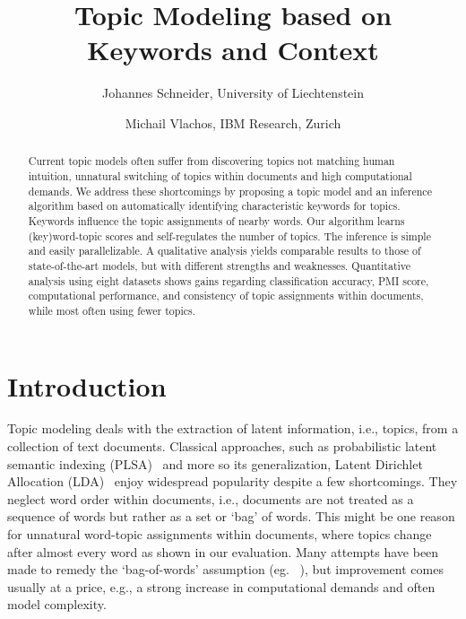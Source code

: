 \documentclass[twocolumn,10]{article}
\title{Topic Modeling based on Keywords and Context}
\author{Johannes Schneider, University of Liechtenstein \and Michail Vlachos, IBM Research, Zurich}
\newcommand{\ci}{~\cite} \newcommand{\re}{~\ref} \newcommand{\ma}{\mathbb}
\begin{document}
	\maketitle
	\begin{abstract}
		Current topic models often suffer from discovering topics not matching human intuition, unnatural switching of topics within documents and high computational demands. We address these shortcomings by proposing a topic model and an inference algorithm based on automatically identifying characteristic keywords for topics. Keywords influence the topic assignments of nearby words. Our algorithm learns (key)word-topic scores and self-regulates the number of topics. The inference is simple and easily parallelizable. A qualitative analysis yields comparable results to those of state-of-the-art models, but with different strengths and weaknesses. Quantitative analysis using eight datasets shows gains regarding classification accuracy, PMI score, computational performance, and consistency of topic assignments within documents, while most often using fewer topics.
	\end{abstract}
	
	
	\section{Introduction} \label{sec:Intro}
	Topic modeling deals with the extraction of latent information, i.e., topics, from a collection of text documents. Classical approaches, such as probabilistic latent semantic indexing (PLSA)\ci{hof99} and more so its generalization, Latent Dirichlet Allocation (LDA)\ci{ble03} enjoy widespread popularity despite a few shortcomings. They neglect word order within documents, i.e., documents are not treated as a sequence of words but rather as a set or `bag' of words. This might be one reason for unnatural word-topic assignments within documents, where topics change after almost every word as shown in our evaluation.  Many attempts have been made to remedy the `bag-of-words' assumption (eg. \ci{gru07,hai13,wal06,yan13}), but improvement comes usually at a price, e.g., a strong increase in computational demands and often model complexity. %
\end{document}
